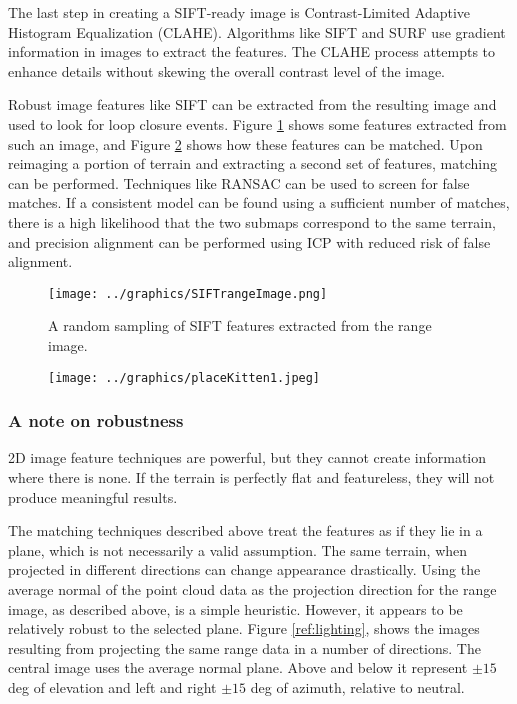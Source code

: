 The last step in creating a SIFT-ready image is Contrast-Limited Adaptive Histogram Equalization (CLAHE). Algorithms like SIFT and SURF use gradient information in images to extract the features. The CLAHE process attempts to enhance details without skewing the overall contrast level of the image. \cite{clahe?}


Robust image features like SIFT can be extracted from the resulting image and used to look for loop closure events. Figure \ref{fig:SIFTrangeImage} shows some features extracted from such an image, and Figure \ref{fig:matches} shows how these features can be matched. Upon reimaging a portion of terrain and extracting a second set of features, matching can be performed. Techniques like RANSAC can be used to screen for false matches. If a consistent model can be found using a sufficient number of matches, there is a high likelihood that the two submaps correspond to the same terrain, and precision alignment can be performed using ICP with reduced risk of false alignment. 

\begin{figure}[htbp]
   \centering
   \texttt{[image: ../graphics/SIFTrangeImage.png]} %
   \caption{A random sampling of SIFT features extracted from the range image.}
   \label{fig:SIFTrangeImage}
\end{figure}

\begin{figure}[htbp]
   \centering
   \texttt{[image: ../graphics/placeKitten1.jpeg]} %
   \caption{}
   \label{fig:matches}
\end{figure}

\subsubsection{A note on robustness}

2D image feature techniques are powerful, but they cannot create information where there is none. If the terrain is perfectly flat and featureless, they will not produce meaningful results. 

The matching techniques described above treat the features as if they lie in a plane, which is not necessarily a valid assumption. The same terrain, when projected in different directions can change appearance drastically. Using the average normal of the point cloud data as the projection direction for the range image, as described above, is a simple heuristic. However, it appears to be relatively robust to the selected plane. Figure \ref{ref:lighting}, shows the images resulting from projecting the same range data in a number of directions. The central image uses the average normal plane. Above and below it represent $\pm 15$deg of elevation and left and right $\pm 15$ deg of azimuth, relative to neutral.


